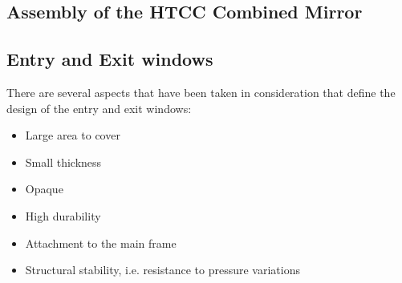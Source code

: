 \subsection{Assembly of the HTCC Combined Mirror}
 

\subsection{Entry and Exit windows}

\indent There are several aspects that have been taken in consideration that define the design of the entry and exit windows:

\begin{itemize}
    \item Large area to cover
    \item Small thickness
    \item Opaque
    \item High durability
    \item Attachment to the main frame
    \item Structural stability, i.e. resistance to pressure variations
    \end{itemize}

